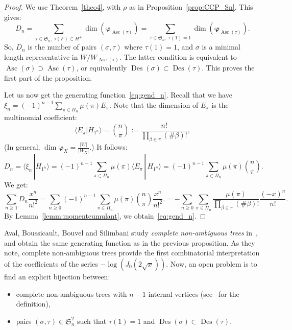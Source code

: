 \documentclass[11pt]{article}
\theoremstyle{definition}
\DeclareMathOperator{\des}{Des}
\DeclareMathOperator{\asc}{Asc}
\newcommand{\bphi}{\boldsymbol{\varphi}}
\begin{document}
\begin{proof}
    We use Theorem~\ref{theo4}, with $\rho$ as in Proposition~\ref{prop:CCP_Sn}.  This gives:
    \[
        D_n
            =
        \sum_{\tau \in \mathfrak{S}_n,\; \tau(F) \subset H^+ } \dim( \bphi_{\asc(\tau)} )
            =
        \sum_{\tau \in \mathfrak{S}_n,\; \tau(1)=1} \dim( \bphi_{\asc(\tau)} ).
    \]
    So, $D_n$ is the number of pairs $(\sigma,\tau)$ where $\tau(1)=1$, and $\sigma$ is a minimal length representative in $W/ W_{\asc(\tau)}$.  The latter condition is equivalent to $\asc(\sigma) \supset \asc(\tau)$, or equivalently $\des(\sigma) \subset \des(\tau)$.  This proves the first part of the proposition.

    Let us now get the generating function~\eqref{eq:gend_n}.  Recall that we have $\xi_n = (-1)^{n-1} \sum_{\pi\in\Pi_n} \mu(\pi) E_\pi$.  Note that the dimension of $E_\pi$ is the multinomial coefficient:
    \[
        \langle E_\pi | H_{1^n} \rangle
            =
        \binom{n}{\pi} := \frac{n!}{\prod_{\beta\in\pi} (\#\beta) !} ,
    \]
    (In general, $\dim\bphi_X = \frac{|W|}{|W_X|}$.)   It follows:
    \[
        D_n = \langle \xi_n \,| H_{1^n} \rangle
        =
        (-1)^{n-1} \sum_{\pi\in\Pi_n} \mu(\pi) \langle E_\pi \,|\,  H_{1^n} \rangle
        =
        (-1)^{n-1}  \sum_{\pi\in\Pi_n} \mu(\pi) \binom{n}{\pi}.
    \]
    We get:
    \[
        \sum_{n\geq 1} D_n \frac{x^n}{n!^2}
            =
        \sum_{n\geq 0} (-1)^{n-1} \sum_{\pi\in\Pi_n} \mu(\pi) \binom{n}{\pi}\frac{x^n}{n!^2}.
            =
        - \sum_{n\geq 0} \sum_{\pi\in\Pi_n} \frac{\mu(\pi)}{\prod_{\beta\in\pi} (\#\beta)! } \frac{(-x)^n}{n!}.
    \]
    By Lemma~\ref{lemm:momentcumulant}, we obtain~\eqref{eq:gend_n}.
\end{proof}

Aval, Boussicault, Bouvel and Silimbani study {\it complete non-ambiguous trees} in~\cite[Section~4]{avalboussicaultbouvelsilimbani}, and obtain the same generating function as in the previous proposition.  As they note, complete non-ambiguous trees provide the first combinatorial interpretation of the coefficients of the series $-\log(J_0(2\sqrt{x}))$.  Now, an open problem is to find an explicit bijection between:
\begin{itemize}
    \item complete non-ambiguous trees with $n-1$ internal vertices (see~\cite{avalboussicaultbouvelsilimbani} for the definition), 
    \item pairs $(\sigma,\tau) \in \mathfrak{S}_n^2$ such that $\tau(1)=1$ and $\des(\sigma) \subset \des(\tau)$.
\end{itemize}
\end{document}
